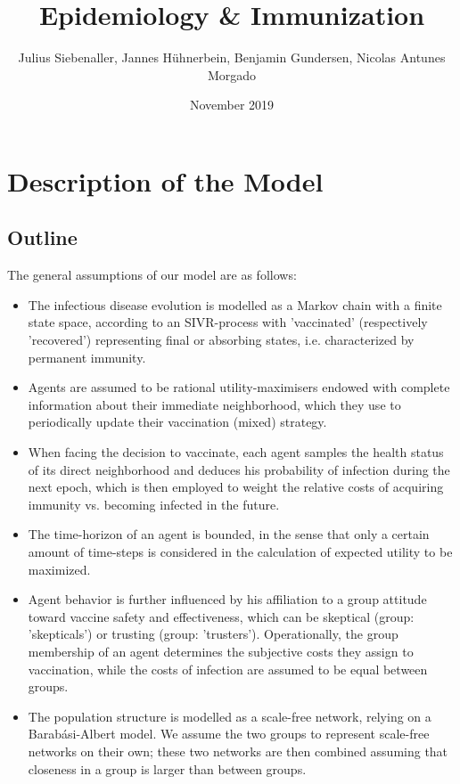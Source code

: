 \documentclass[11pt]{article}
\title{Epidemiology \& Immunization}
\author{Julius Siebenaller, Jannes Hühnerbein, Benjamin Gundersen, Nicolas Antunes Morgado}
\date{November 2019}
\begin{document}
\section{Description of the Model}


\subsection{Outline}

The general assumptions of our model are as follows:

\begin{itemize}
\item{The infectious disease evolution is modelled as a Markov chain with a finite state space, according to an SIVR-process with 'vaccinated' (respectively 'recovered') representing final or absorbing states, i.e. characterized by permanent immunity.}
\item{Agents are assumed to be rational utility-maximisers endowed with complete information about their immediate neighborhood, which they use to periodically update their vaccination (mixed) strategy.}
\item{When facing the decision to vaccinate, each agent samples the health status of its direct neighborhood and deduces his probability of infection during the next epoch, which is then employed to weight the relative costs of acquiring immunity vs. becoming infected in the future.}
\item{The time-horizon of an agent is bounded, in the sense that only a certain amount of time-steps is considered in the calculation of expected utility to be maximized.}
\item{Agent behavior is further influenced by his affiliation to a group attitude toward vaccine safety and effectiveness, which can be skeptical (group: 'skepticals') or trusting (group: 'trusters'). Operationally, the group membership of an agent determines the subjective costs they assign to vaccination, while the costs of infection are assumed to be equal between groups.}
\item{The population structure is modelled as a scale-free network, relying on a Barabási-Albert model. We assume the two groups to represent scale-free networks on their own; these two networks are then combined assuming that closeness in a group is larger than between groups.}
\end{itemize}
\end{document}

